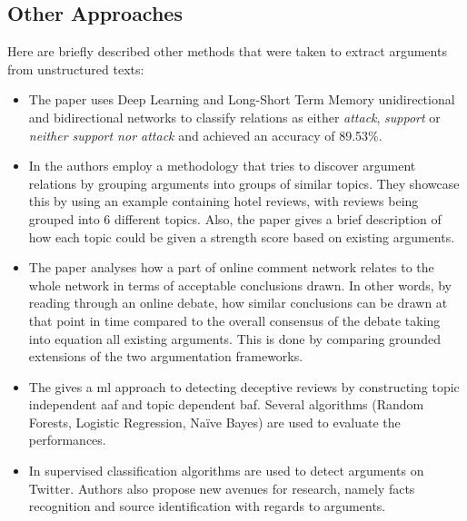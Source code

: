     \subsection{Other Approaches}
        Here are briefly described other methods that were taken to extract arguments from unstructured texts:
        \begin{itemize}
            \item The \autocite{Cocarascu2017IdentifyingAA} paper uses Deep Learning and Long-Short Term Memory unidirectional and bidirectional networks to classify relations as either \textit{attack}, \textit{support} or \textit{neither support nor attack} and achieved an accuracy of 89.53\%. 
            
            \item In \autocite{Cocarascu2017MiningBA} the authors employ a methodology that tries to discover argument relations by grouping arguments into groups of similar topics. They showcase this by using an example containing hotel reviews, with reviews being grouped into 6 different topics. Also, the paper gives a brief description of how each topic could be given a strength score based on existing arguments.
            
            \item The \autocite{ApproxToTruth} paper analyses how a part of online comment network relates to the whole network in terms of acceptable conclusions drawn. In other words, by reading through an online debate, how similar conclusions can be drawn at that point in time compared to the overall consensus of the debate taking into equation all existing arguments. This is done by comparing grounded extensions of the two argumentation frameworks.
            
            \item The \autocite{Cocarascu2016DetectingDR} gives a \gls{ml} approach to detecting deceptive reviews by constructing topic independent \gls{aaf} and topic dependent \gls{baf}. Several algorithms (Random Forests, Logistic Regression, Na{\"i}ve Bayes) are used to evaluate the performances.
            
            \item In \autocite{Dusmanu2017ArgumentMO} supervised classification algorithms are used to detect arguments on Twitter. Authors also propose new avenues for research, namely facts recognition and source identification with regards to arguments.
        \end{itemize}